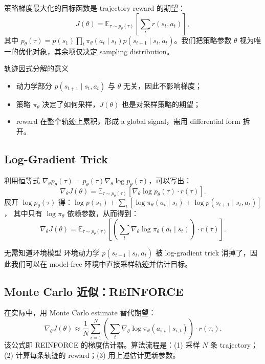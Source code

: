 \documentclass[a4paper]{article}
\begin{document}
策略梯度最大化的目标函数是 trajectory reward 的期望：
$$J(\theta) = \mathbb{E}_{\tau \sim p_\theta(\tau)} \left[ \sum_t r(s_t, a_t) \right],$$
其中 $p_\theta(\tau) = p(s_1)\prod_t \pi_\theta(a_t\mid s_t)p(s_{t+1}\mid s_t,a_t)$。我们把策略参数 $\theta$ 视为唯一的优化对象，其余项仅决定 sampling distribution。

\begin{knowledgebox}{轨迹因式分解的意义}
\begin{itemize}
    \item 动力学部分 $p(s_{t+1}\mid s_t,a_t)$ 与 $\theta$ 无关，因此不影响梯度；
    \item 策略 $\pi_\theta$ 决定了如何采样，$J(\theta)$ 也是对采样策略的期望；
    \item reward 在整个轨迹上累积，形成 a global signal，需用 differential form 拆开。
\end{itemize}
\end{knowledgebox}

\subsection{Log-Gradient Trick}

利用恒等式 $\nabla_\theta p_\theta(\tau) = p_\theta(\tau) \nabla_\theta \log p_\theta(\tau)$，可以写出：
$$\nabla_\theta J(\theta) = \mathbb{E}_{\tau \sim p_\theta(\tau)} \left[ \nabla_\theta \log p_\theta(\tau) \cdot r(\tau) \right].$$
展开 $\log p_\theta(\tau)$ 得：$\log p(s_1) + \sum_t \left[\log \pi_\theta(a_t\mid s_t) + \log p(s_{t+1}\mid s_t,a_t)\right]$，
其中只有 $\log \pi_\theta$ 依赖参数，从而得到：
$$\nabla_\theta J(\theta) = \mathbb{E}_{\tau \sim p_\theta(\tau)} \left[ \left(\sum_t \nabla_\theta \log \pi_\theta(a_t\mid s_t)\right) \cdot r(\tau) \right].$$

\begin{importantbox}{无需知道环境模型}
环境动力学 $p(s_{t+1}\mid s_t,a_t)$ 被 log-gradient trick 消掉了，因此我们可以在 model-free 环境中直接采样轨迹并估计目标。
\end{importantbox}

\subsection{Monte Carlo 近似：REINFORCE}

在实际中，用 Monte Carlo estimate 替代期望：
$$\nabla_\theta J(\theta) \approx \frac{1}{N} \sum_{i=1}^{N} \left(\sum_t \nabla_\theta \log \pi_\theta(a_{i,t}\mid s_{i,t})\right) \cdot r(\tau_i).$$
该公式即 REINFORCE 的梯度估计器。算法流程是：(1) 采样 $N$ 条 trajectory；(2) 计算每条轨迹的 reward；(3) 用上述估计更新参数。
\end{document}

